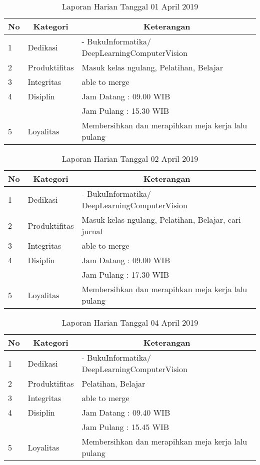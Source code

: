 \begin{table}[htp]
\caption{Laporan Harian Tanggal 01 April 2019}
\label{tab:lh010419}
\begin{tabular}{|l|l|l|}
\hline
\textbf{No} & \multicolumn{1}{c|}{\textbf{Kategori}} & \multicolumn{1}{c|}{\textbf{Keterangan}} \\ \hline
1 & Dedikasi & - BukuInformatika/ DeepLearningComputerVision \\ \hline
2 & Produktifitas & Masuk kelas ngulang, Pelatihan, Belajar  \\
3 & Integritas & able to merge \\ \hline
4 & Disiplin & Jam Datang : 09.00 WIB \\
 &  & Jam Pulang : 15.30 WIB \\ \hline
5 & Loyalitas & Membersihkan dan merapihkan meja kerja lalu pulang  \\ \hline
\end{tabular}
\end{table}

\begin{table}[htp]
\caption{Laporan Harian Tanggal 02 April 2019}
\label{tab:lh020419}
\begin{tabular}{|l|l|l|}
\hline
\textbf{No} & \multicolumn{1}{c|}{\textbf{Kategori}} & \multicolumn{1}{c|}{\textbf{Keterangan}} \\ \hline
1 & Dedikasi & - BukuInformatika/ DeepLearningComputerVision \\ \hline
2 & Produktifitas & Masuk kelas ngulang, Pelatihan, Belajar, cari jurnal  \\
3 & Integritas & able to merge \\ \hline
4 & Disiplin & Jam Datang : 09.00 WIB \\
 &  & Jam Pulang : 17.30 WIB \\ \hline
5 & Loyalitas & Membersihkan dan merapihkan meja kerja lalu pulang  \\ \hline
\end{tabular}
\end{table}


\begin{table}[htp]
\caption{Laporan Harian Tanggal 04 April 2019}
\label{tab:lh040419}
\begin{tabular}{|l|l|l|}
\hline
\textbf{No} & \multicolumn{1}{c|}{\textbf{Kategori}} & \multicolumn{1}{c|}{\textbf{Keterangan}} \\ \hline
1 & Dedikasi & - BukuInformatika/ DeepLearningComputerVision \\ \hline
2 & Produktifitas & Pelatihan, Belajar  \\
3 & Integritas & able to merge \\ \hline
4 & Disiplin & Jam Datang : 09.40 WIB \\
 &  & Jam Pulang : 15.45 WIB \\ \hline
5 & Loyalitas & Membersihkan dan merapihkan meja kerja lalu pulang  \\ \hline
\end{tabular}
\end{table}



